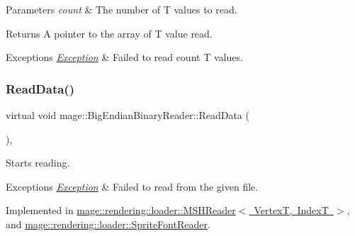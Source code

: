 \begin{DoxyParams}{Parameters}
{\em count} & The number of {\ttfamily T} values to read. \\
\hline
\end{DoxyParams}
\begin{DoxyReturn}{Returns}
A pointer to the array of {\ttfamily T} value read. 
\end{DoxyReturn}

\begin{DoxyExceptions}{Exceptions}
{\em \mbox{\hyperlink{classmage_1_1_exception}{Exception}}} & Failed to read {\ttfamily count} {\ttfamily T} values. \\
\hline
\end{DoxyExceptions}
\mbox{\label{classmage_1_1_big_endian_binary_reader_a7dc0689d598fa91308597b129516a11d}} 
\subsubsection{\texorpdfstring{Read\+Data()}{ReadData()}}
{\footnotesize\ttfamily virtual void mage\+::\+Big\+Endian\+Binary\+Reader\+::\+Read\+Data (\begin{DoxyParamCaption}{ }\end{DoxyParamCaption})\hspace{0.3cm}{\ttfamily [private]}, {}}

Starts reading.


\begin{DoxyExceptions}{Exceptions}
{\em \mbox{\hyperlink{classmage_1_1_exception}{Exception}}} & Failed to read from the given file. \\
\hline
\end{DoxyExceptions}


Implemented in \mbox{\hyperlink{classmage_1_1rendering_1_1loader_1_1_m_s_h_reader_a99e8e3c50decb9332dc10bcdf7b6e00a}{mage\+::rendering\+::loader\+::\+M\+S\+H\+Reader$<$ Vertex\+T, Index\+T $>$}}, and \mbox{\hyperlink{classmage_1_1rendering_1_1loader_1_1_sprite_font_reader_ae5b827dade3bd800e2000788efa91e30}{mage\+::rendering\+::loader\+::\+Sprite\+Font\+Reader}}.

\mbox{\label{classmage_1_1_big_endian_binary_reader_a0308b90e3cf888d383a228cfe8827972}} 
